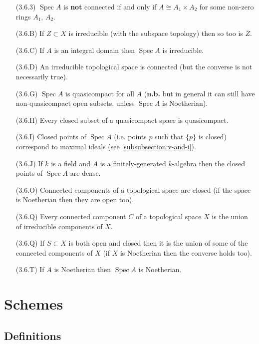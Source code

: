 \documentclass[10pt]{article}
\DeclareMathOperator{\Spec}{Spec}
\begin{document}
                \begin{itemize}
                    \item[(3.6.3)] $\Spec A$ is \textbf{not} connected if and only if $A\cong A_1\times A_2$ for some non-zero rings $A_1$, $A_2$.
                    \item[(3.6.B)] If $Z\subset X$ is irreducible (with the subspace topology) then so too is $\overline{Z}$.
                    \item[(3.6.C)] If $A$ is an integral domain then $\Spec A$ is irreducible.
                    \item[(3.6.D)] An irreducible topological space is connected (but the converse is not necessarily true).
                    \item[(3.6.G)] $\Spec A$ is quasicompact for all $A$ (\textbf{n.b.} but in general it can still have non-quasicompact open subsets, unless $\Spec A$ is Noetherian).
                    \item[(3.6.H)] Every closed subset of a quasicompact space is quasicompact.
                    \item[(3.6.I)] Closed points of $\Spec A$ (i.e. points $p$ such that $\{p\}$ is closed) correspond to maximal ideals (see \cref{subsubsection:v-and-i}).
                    \item[(3.6.J)] If $k$ is a field and $A$ is a finitely-generated $k$-algebra then the closed points of $\Spec A$ are dense.
                    \item[(3.6.O)] Connected components of a topological space are closed (if the space is Noetherian then they are open too).
                    \item[(3.6.Q)] Every connected component $C$ of a topological space $X$ is the union of irreducible components of $X$.
                    \item[(3.6.Q)] If $S\subset X$ is both open and closed then it is the union of some of the connected components of $X$ (if $X$ is Noetherian then the converse holds too).
                    \item[(3.6.T)] If $A$ is Noetherian then $\Spec A$ is Noetherian.
                \end{itemize}

    \section{Schemes}
    
        \subsection{Definitions}
        
\end{document}
